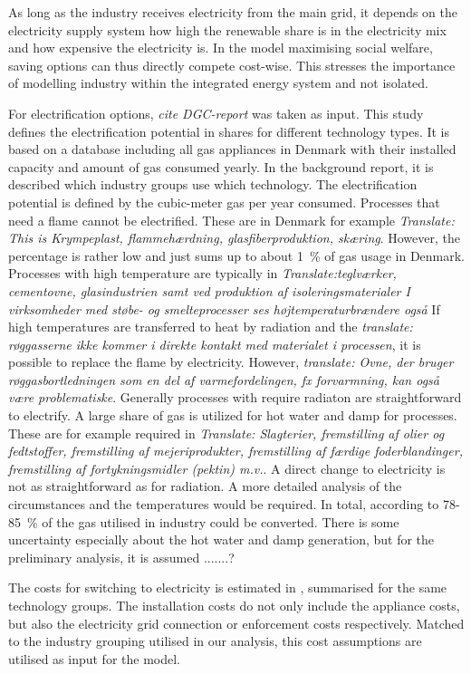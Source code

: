 \documentclass[review]{elsarticle}
\begin{document}
As long as the industry receives electricity from the main grid, it depends on the electricity supply system how high the renewable share is in the electricity mix and how expensive the electricity is. In the model maximising social welfare, saving options can thus directly compete cost-wise. This stresses the importance of modelling industry within the integrated energy system and not isolated.

For electrification options, \textit{cite DGC-report} was taken as input. This study defines the electrification potential in shares for different technology types. It is based on a database including all gas appliances in Denmark with their installed capacity and amount of gas consumed yearly. In the background report, it is described which industry groups use which technology. The electrification potential is defined by the cubic-meter gas per year consumed. Processes that need a flame cannot be electrified. These are in Denmark for example \textit{Translate: This is Krympeplast, flammehærdning, glasfiberproduktion, skæring}. However, the percentage is rather low and just sums up to about 1~\% of gas usage in Denmark. Processes with high temperature are typically in \textit{Translate:teglværker, cementovne, glasindustrien samt ved produktion af isoleringsmaterialer I virksomheder med støbe- og smelteprocesser ses højtemperaturbrændere også} If high temperatures are transferred to heat by radiation and the \textit{translate: røggasserne ikke kommer i direkte kontakt med materialet i processen}, it is possible to replace the flame by electricity. However, \textit{translate: Ovne, der bruger røggasbortledningen som en del af varmefordelingen, fx forvarmning, kan også være problematiske}.
Generally processes with require radiaton are straightforward to electrify. A large share of gas is utilized for hot water and damp for processes. These are for example required in \textit{Translate: Slagterier, fremstilling af olier og fedtstoffer, fremstilling af mejeriprodukter, fremstilling af færdige foderblandinger, fremstilling af fortykningsmidler (pektin) m.v.}. A direct change to electricity is not as straightforward as for radiation. A more detailed analysis of the circumstances and the temperatures would be required.
In total, according to \cite{DGC2013a} 78-85~\% of the gas utilised in industry could be converted. There is some uncertainty especially about the hot water and damp generation, but for the preliminary analysis, it is assumed .......?

The costs for switching to electricity is estimated in \cite{DGC2013b}, summarised for the same technology groups. The installation costs do not only include the appliance costs, but also the electricity grid connection or enforcement costs respectively. Matched to the industry grouping utilised in our analysis, this cost assumptions are utilised as input for the model.
\end{document}
